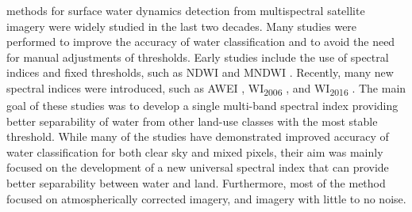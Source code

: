  methods for surface water dynamics detection from multispectral satellite imagery were widely studied in the last two decades. Many studies were performed to improve the accuracy of water classification and to avoid the need for manual adjustments of thresholds. Early studies include the use of spectral indices and fixed thresholds, such as \gls{NDWI} \citet{McFeeters1996} and \gls{MNDWI} \citet{Xu2006}. Recently, many new spectral indices were introduced, such as \gls{AWEI} \citet{feyisa2014automated}, WI\textsubscript{2006} \citet{homer2004development}, and WI\textsubscript{2016} \citet{fisher2016comparing}. The main goal of these studies was to develop a single multi-band spectral index providing better separability of water from other land-use classes with the most stable threshold.  While many of the studies have demonstrated improved accuracy of water classification for both clear sky and mixed pixels, their aim was mainly focused on the development of a new universal spectral index that can provide better separability between water and land. Furthermore, most of the method focused on atmospherically corrected imagery, and imagery with little to no noise. 

